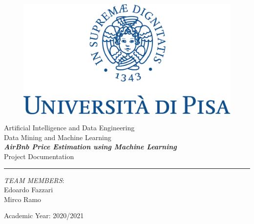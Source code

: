 \documentclass[11pt]{article}
\begin{document}
\begin{titlepage}
    \begin{center}
        \begin{figure}
            \includegraphics[width=\textwidth]{img/marchio_unipi_pant541-eps-converted-to.pdf}         
        \end{figure}
        {\Large
        Artificial Intelligence and Data Engineering\\
        \vspace{5mm} %
        Data Mining and Machine Learning}\\
        \vspace{30mm} %
        {\Huge\textbf{\textit{AirBnb Price Estimation using Machine Learning}}}\\
        \vspace{10mm} %
        {\Large Project Documentation}\\
        \par\noindent\rule{\textwidth}{0.4pt}
            \begin{flushright}
                \textit{TEAM MEMBERS}:\\
                Edoardo Fazzari\\ 
                Mirco Ramo\\
        	
            \end{flushright}
            \vfill
        Academic Year: 2020/2021\\        
    \end{center}
\end{titlepage} 
   
\tableofcontents





\end{document}

